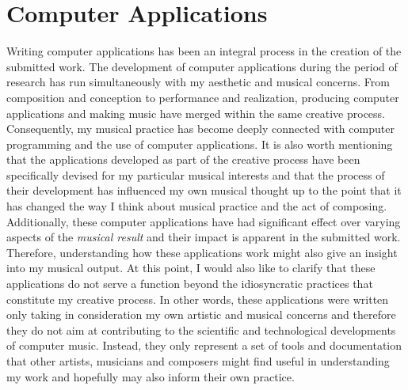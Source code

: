 \hypertarget{chapter6}{}
\chapter{Computer Applications}

Writing computer applications has been an integral process in the creation of the submitted work. The development of computer applications during the period of research has run simultaneously with my aesthetic and musical concerns. From composition and conception to performance and realization, producing computer applications and making music have merged within the same creative process. Consequently, my musical practice has become deeply connected with computer programming and the use of computer applications. It is also worth mentioning that the applications developed as part of the creative process have been specifically devised for my particular musical interests and that the process of their development has influenced my own musical thought up to the point that it has changed the way I think about musical practice and the act of composing. Additionally, these computer applications have had significant effect over varying aspects of the \emph{musical result} and their impact is apparent in the submitted work. Therefore, understanding how these applications work might also give an insight into my musical output. At this point, I would also like to clarify that these applications do not serve a function beyond the idiosyncratic practices that constitute my creative process. In other words, these applications were written only taking in consideration my own artistic and musical concerns and therefore they do not aim at contributing to the scientific and technological developments of computer music. Instead, they only represent a set of tools and documentation that other artists, musicians and composers might find useful in understanding my work and hopefully may also inform their own practice.

